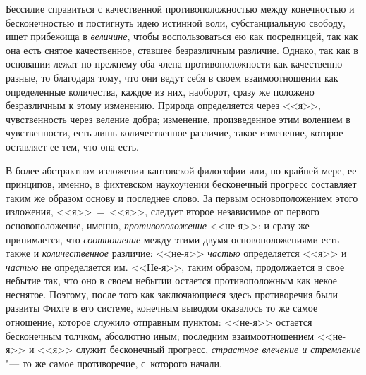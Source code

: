 Бессилие справиться с качественной противоположностью между конечностью и
бесконечностью и постигнуть идею истинной воли, субстанциальную свободу, ищет
прибежища в {\em величине}, чтобы воспользоваться ею как посредницей, так как
она есть снятое качественное, ставшее безразличным различие. Однако, так как
в основании лежат по-прежнему оба члена противоположности как качественно
разные, то благодаря тому, что они ведут себя в своем взаимоотношении как
определенные количества, каждое из них, наоборот, сразу же положено
безразличным к этому изменению. Природа определяется через <<я>>, чувственность
через веление добра; изменение, произведенное этим волением в чувственности,
есть лишь количественное различие, такое изменение, которое оставляет ее тем,
что она есть.

В более абстрактном изложении кантовской философии или, по крайней мере, ее
принципов, именно, в фихтевском наукоучении бесконечный прогресс составляет таким
же образом основу и последнее слово. За первым основоположением этого
изложения, <<я>>~=~<<я>>, следует второе независимое от первого
основоположение, именно, {\em противоположение} <<не-я>>; и сразу же
принимается, что {\em соотношение} между этими двумя основоположениями есть
также и {\em количественное} различие: <<не-я>> {\em частью} определяется <<я>>
и {\em частью} не определяется им. <<Не-я>>, таким образом, продолжается в свое
небытие так, что оно в своем небытии остается противоположным как некое
неснятое. Поэтому, после того как заключающиеся здесь противоречия были развиты
Фихте в его системе, конечным выводом оказалось то же самое отношение, которое
служило отправным пунктом: <<не-я>> остается бесконечным
толчком, абсолютно иным; последним
взаимоотношением <<не-я>> и <<я>> служит бесконечный прогресс, {\em страстное
влечение и стремление} "--- то же самое противоречие, с~которого начали.

